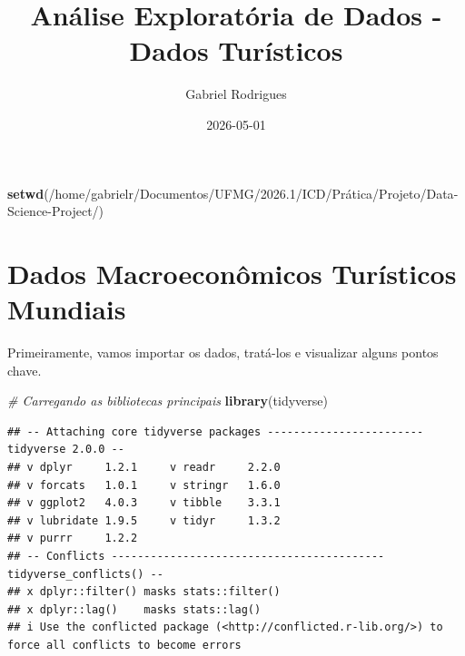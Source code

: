 \documentclass[
]{article}
\title{Análise Exploratória de Dados - Dados Turísticos}
\author{Gabriel Rodrigues}
\date{2026-05-01}
\newenvironment{Shaded}{\begin{snugshade}}{\end{snugshade}}
\newcommand{\CommentTok}[1]{\textcolor[rgb]{0.56,0.35,0.01}{\textit{#1}}}
\newcommand{\FunctionTok}[1]{\textcolor[rgb]{0.13,0.29,0.53}{\textbf{#1}}}
\newcommand{\NormalTok}[1]{#1}
\newcommand{\StringTok}[1]{\textcolor[rgb]{0.31,0.60,0.02}{#1}}
\begin{document}
\maketitle

\begin{Shaded}
\begin{Highlighting}[]
\FunctionTok{setwd}\NormalTok{(}\StringTok{\textquotesingle{}/home/gabrielr/Documentos/UFMG/2026.1/ICD/Prática/Projeto/Data{-}Science{-}Project/\textquotesingle{}}\NormalTok{)}
\end{Highlighting}
\end{Shaded}

\section{Dados Macroeconômicos Turísticos
Mundiais}\label{dados-macroeconuxf4micos-turuxedsticos-mundiais}

Primeiramente, vamos importar os dados, tratá-los e visualizar alguns
pontos chave.

\begin{Shaded}
\begin{Highlighting}[]
\CommentTok{\# Carregando as bibliotecas principais}
\FunctionTok{library}\NormalTok{(tidyverse)}
\end{Highlighting}
\end{Shaded}

\begin{verbatim}
## -- Attaching core tidyverse packages ------------------------ tidyverse 2.0.0 --
## v dplyr     1.2.1     v readr     2.2.0
## v forcats   1.0.1     v stringr   1.6.0
## v ggplot2   4.0.3     v tibble    3.3.1
## v lubridate 1.9.5     v tidyr     1.3.2
## v purrr     1.2.2     
## -- Conflicts ------------------------------------------ tidyverse_conflicts() --
## x dplyr::filter() masks stats::filter()
## x dplyr::lag()    masks stats::lag()
## i Use the conflicted package (<http://conflicted.r-lib.org/>) to force all conflicts to become errors
\end{verbatim}
\end{document}

